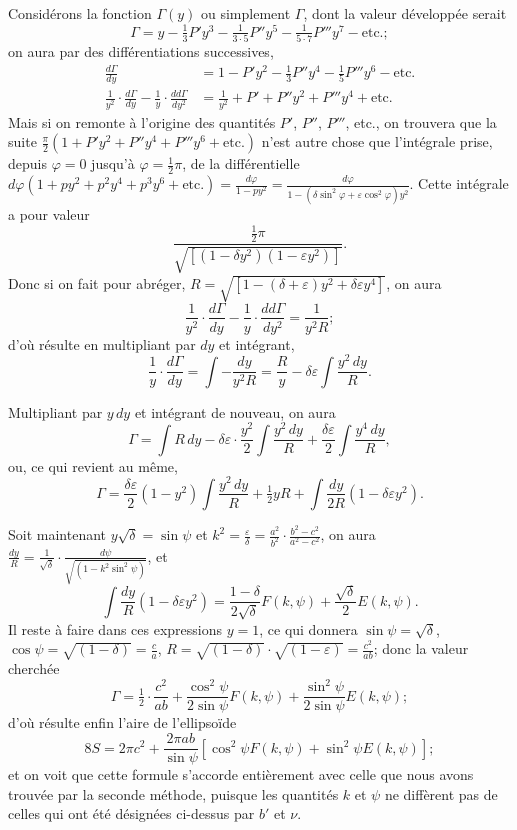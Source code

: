 \documentclass{article}
\begin{document}
Considérons la fonction $\Gamma(y)$ ou simplement $\Gamma$, dont la valeur développée serait
\[ \Gamma=y-\tfrac{1}{3}P'y^{3}-\tfrac{1}{3\cdot5}P''y^{5}-\tfrac{1}{5\cdot7}P'''y^{7}-\text{etc.}; \]
on aura par des différentiations successives,
\[ \begin{aligned} \frac{d\Gamma}{dy}&=1-P'y^{2}-\tfrac{1}{3}P''y^{4}-\tfrac{1}{5}P'''y^{6}-\text{etc.}\\ \frac{1}{y^{2}}\cdot\frac{d\Gamma}{dy}-\frac{1}{y}\cdot\frac{dd\Gamma}{dy^{2}}&=\frac{1}{y^{2}}+P'+P''y^{2}+P'''y^{4}+\text{etc.} \end{aligned} \]
Mais si on remonte à l'origine des quantités $P'$, $P''$, $P'''$, etc., on trouvera que la suite $\frac{\pi}{2}(1+P'y^{2}+P''y^{4}+P'''y^{6}+\text{etc.})$ n'est autre chose que l'intégrale prise, depuis $\varphi=0$ jusqu'à $\varphi=\frac{1}{2}\pi$, de la différentielle $d\varphi(1+py^{2}+p^{2}y^{4}+p^{3}y^{6}+\text{etc.})=\frac{d\varphi}{1-py^{2}}=\frac{d\varphi}{1-(\delta\sin^{2}\varphi+\varepsilon\cos^{2}\varphi)y^{2}}$. Cette intégrale a pour valeur
\[ \frac{\tfrac{1}{2}\pi}{\sqrt{[(1-\delta y^{2})(1-\varepsilon y^{2})]}}. \]
Donc si on fait pour abréger, $R=\sqrt{[1-(\delta+\varepsilon)y^{2}+\delta\varepsilon y^{4}]}$, on aura
\[ \frac{1}{y^{2}}\cdot\frac{d\Gamma}{dy}-\frac{1}{y}\cdot\frac{dd\Gamma}{dy^{2}}=\frac{1}{y^{2}R}; \]
d'où résulte en multipliant par $dy$ et intégrant,
\[ \frac{1}{y}\cdot\frac{d\Gamma}{dy}=\int-\frac{dy}{y^{2}R}=\frac{R}{y}-\delta\varepsilon\int\frac{y^{2}\,dy}{R}. \]

Multipliant par $y\,dy$ et intégrant de nouveau, on aura
\[ \Gamma=\int R\,dy-\delta\varepsilon\cdot\frac{y^{2}}{2}\int\frac{y^{2}\,dy}{R}+\frac{\delta\varepsilon}{2}\int\frac{y^{4}\,dy}{R}, \]
ou, ce qui revient au même,
\[ \Gamma=\frac{\delta\varepsilon}{2}(1-y^{2})\int\frac{y^{2}\,dy}{R}+\tfrac{1}{2}yR+\int\frac{dy}{2R}(1-\delta\varepsilon y^{2}). \]

Soit maintenant $y\sqrt{\delta}=\sin\psi$ et $k^{2}=\frac{\varepsilon}{\delta}=\frac{a^{2}}{b^{2}}\cdot\frac{b^{2}-c^{2}}{a^{2}-c^{2}}$, on aura $\frac{dy}{R}=\frac{1}{\sqrt{\delta}}\cdot\frac{d\psi}{\sqrt{(1-k^{2}\sin^{2}\psi)}}$, et
\[ \int\frac{dy}{R}(1-\delta\varepsilon y^{2})=\frac{1-\delta}{2\sqrt{\delta}}F(k,\psi)+\frac{\sqrt{\delta}}{2}E(k,\psi). \]
Il reste à faire dans ces expressions $y=1$, ce qui donnera $\sin\psi=\sqrt{\delta}$, $\cos\psi=\sqrt{(1-\delta)}=\frac{c}{a}$, $R=\sqrt{(1-\delta)}\cdot\sqrt{(1-\varepsilon)}=\frac{c^{2}}{ab}$; donc la valeur cherchée
\[ \Gamma=\tfrac{1}{2}\cdot\frac{c^{2}}{ab}+\frac{\cos^{2}\psi}{2\sin\psi}F(k,\psi)+\frac{\sin^{2}\psi}{2\sin\psi}E(k,\psi); \]
d'où résulte enfin l'aire de l'ellipsoïde
\[ 8S=2\pi c^{2}+\frac{2\pi ab}{\sin\psi}[\cos^{2}\psi F(k,\psi)+\sin^{2}\psi E(k,\psi)]; \]
et on voit que cette formule s'accorde entièrement avec celle que nous avons trouvée par la seconde méthode, puisque les quantités $k$ et $\psi$ ne diffèrent pas de celles qui ont été désignées ci-dessus par $b'$ et $\nu$.
\end{document}
